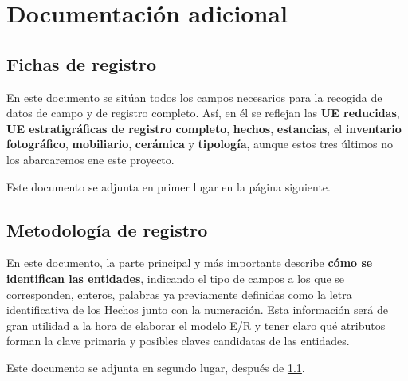 \chapter{Documentación adicional}
\section{Fichas de registro} 
\label{Fichas}
En este documento se sitúan todos los campos necesarios para la recogida de datos de campo
y de registro completo. Así, en él se reflejan las \textbf{UE reducidas}, \textbf{UE
estratigráficas de registro completo},  \textbf{hechos}, \textbf{estancias}, el
\textbf{inventario fotográfico}, \textbf{mobiliario}, \textbf{cerámica} y \textbf{tipología},
aunque estos tres últimos no los abarcaremos ene este proyecto.

Este documento se adjunta en primer lugar en la página siguiente.

\section{Metodología de registro}
En este documento, la parte principal y más importante describe \textbf{cómo se identifican
las entidades}, indicando el tipo de campos a los que se corresponden, enteros, palabras ya
previamente definidas como la letra identificativa de los Hechos junto con la numeración. Esta
información será de gran utilidad a la hora de elaborar el modelo E/R y tener claro qué
atributos forman la clave primaria y posibles claves candidatas de las entidades.

Este documento se adjunta en segundo lugar, después de \ref{Fichas}.





